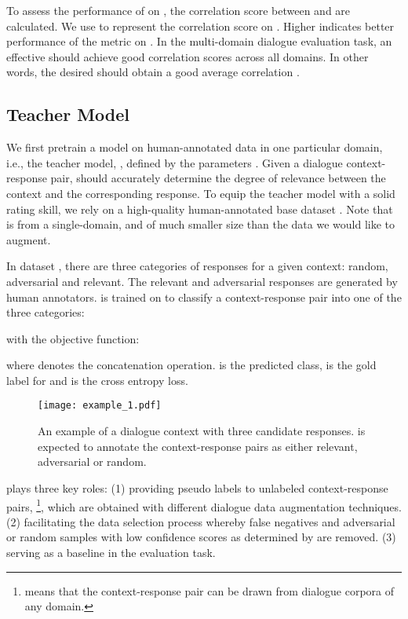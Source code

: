 \documentclass[letterpaper]{article} \usepackage{aaai22}  \usepackage{times}  \usepackage{helvet}  \usepackage{courier}  \usepackage[hyphens]{url}  \usepackage{graphicx} \urlstyle{rm} \def\UrlFont{\rm}  \usepackage{natbib}  \usepackage{caption} \DeclareCaptionStyle{ruled}{labelfont=normalfont,labelsep=colon,strut=off} \frenchspacing  \setlength{\pdfpagewidth}{8.5in}  \setlength{\pdfpageheight}{11in}  \usepackage{algorithm}
\begin{document}
To assess the performance of  on , the correlation score between  and  are calculated. We use  to represent the correlation score on . Higher  indicates better performance of the metric on . In the multi-domain dialogue evaluation task, an effective  should achieve good correlation scores across all  domains. In other words, the desired  should obtain a good average correlation .

\subsection{Teacher Model}
\label{subsec:teacher-model}
We first pretrain a model on human-annotated data in one particular domain, i.e., the teacher model, , defined by the parameters   . Given a dialogue context-response pair,  should accurately determine the degree of relevance between the context and the corresponding response. To equip the teacher model with a solid rating skill, we rely on a high-quality human-annotated base dataset . Note that  is from a single-domain, and of much smaller size than the data we would like to augment. 

In dataset , there are three categories of responses for a given context: random, adversarial and relevant. The relevant and adversarial responses are generated by human annotators.  is trained on  to classify a context-response pair into one of the three categories:

with the objective function:

where  denotes the concatenation operation.  is the predicted class,  is the gold label for  and  is the cross entropy loss. 

\begin{figure}[t!]
\centering
\texttt{[image: example\_1.pdf]} \caption{An example of a dialogue context with three candidate responses.  is expected to annotate the context-response pairs as either relevant, adversarial or random.}  
\label{context-response-example}
\end{figure}

 plays three key roles: (1) providing pseudo labels to unlabeled context-response pairs, \footnote{ means that the context-response pair can be drawn from dialogue corpora of any domain.}, which are obtained with different dialogue data augmentation techniques. (2) facilitating the data selection process whereby false negatives and adversarial or random samples with low confidence scores as determined by  are removed. (3) serving as a baseline in the evaluation task.
\end{document}

